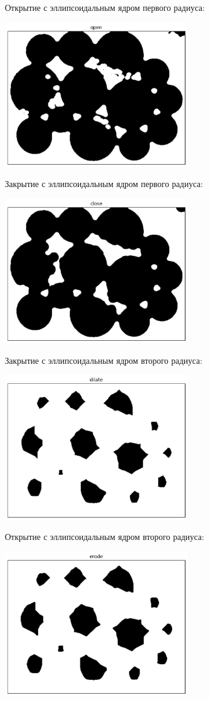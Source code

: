 \documentclass[12pt, a4paper]{article}
\begin{document}
			\begin{center}
				Открытие с эллипсоидальным ядром первого радиуса:

					\includegraphics[width=8cm]{open.png}

				Закрытие с эллипсоидальным ядром первого радиуса:

					\includegraphics[width=8cm]{close.png}

				\newpage
				Закрытие с эллипсоидальным ядром второго радиуса:

					\includegraphics[width=8cm]{dilate.png}

				Открытие с эллипсоидальным ядром второго радиуса:

					\includegraphics[width=8cm]{erode.png}


\end{center}
\end{document}

